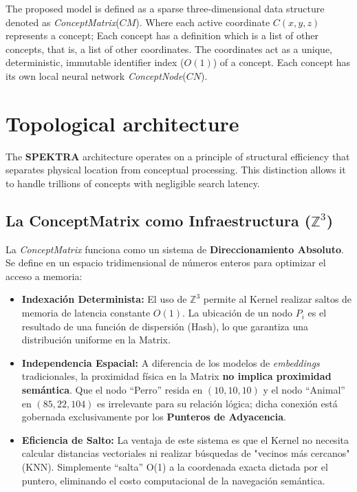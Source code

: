 \documentclass[12pt]{article}
\begin{document}
The proposed model is defined as a sparse three-dimensional data structure denoted as \textit{ConceptMatrix}($CM$). Where each active coordinate $C(x, y, z)$ represents a concept; 
Each concept has a definition which is a list of other concepts, that is, a list of other coordinates.
The coordinates act as a unique, deterministic, immutable identifier index ($O(1)$) of a concept.
Each concept has its own local neural network \textit{ConceptNode}($CN$). 


\section{Topological architecture}

The \textbf{SPEKTRA} architecture operates on a principle of structural efficiency that separates physical location from conceptual processing. This distinction allows it to handle trillions of concepts with negligible search latency.

\subsection{La ConceptMatrix como Infraestructura ($\mathbb{Z}^3$)}
La \textit{ConceptMatrix} funciona como un sistema de \textbf{Direccionamiento Absoluto}. Se define en un espacio tridimensional de números enteros para optimizar el acceso a memoria:

\begin{itemize}
	\item \textbf{Indexación Determinista:} El uso de $\mathbb{Z}^3$ permite al Kernel realizar saltos de memoria de latencia constante $O(1)$. La ubicación de un nodo $P_i$ es el resultado de una función de dispersión (Hash), lo que garantiza una distribución uniforme en la Matrix.
	\item \textbf{Independencia Espacial:} A diferencia de los modelos de \textit{embeddings} tradicionales, la proximidad física en la Matrix \textbf{no implica proximidad semántica}. Que el nodo ``Perro'' resida en $(10, 10, 10)$ y el nodo ``Animal'' en $(85, 22, 104)$ es irrelevante para su relación lógica; dicha conexión está gobernada exclusivamente por los \textbf{Punteros de Adyacencia}.
	\item \textbf{Eficiencia de Salto:} La ventaja de este sistema es que el Kernel no necesita calcular distancias vectoriales ni realizar búsquedas de "vecinos más cercanos" (KNN). Simplemente ``salta''  O(1) a la coordenada exacta dictada por el puntero, eliminando el costo computacional de la navegación semántica.
\end{itemize}
\end{document}
